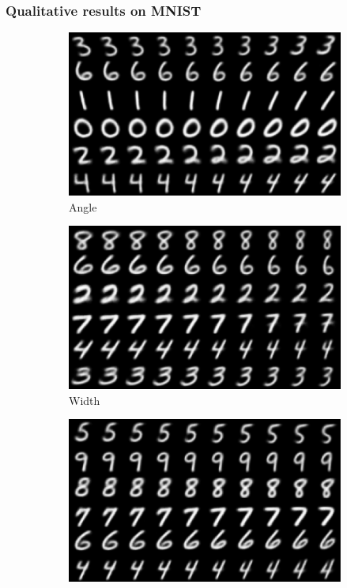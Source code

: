 \documentclass[10pt,mathserif]{beamer}
\begin{document}
\begin{frame}
\frametitle{Qualitative results on MNIST}
\begin{figure}[bp]
\centering
\begin{subfigure}[t]{0.48\linewidth}
\centering
\includegraphics[width=0.8\linewidth]{dis_asset/mnist_slant.png}
\caption{Angle}
\end{subfigure}\hspace{0.005\linewidth}
\begin{subfigure}[t]{0.48\linewidth}
\centering
\includegraphics[width=0.8\linewidth]{dis_asset/mnist_width.png}
\caption{Width}
\end{subfigure}\hspace{0.005\linewidth}
\begin{subfigure}[t]{0.48\linewidth}
\centering
\includegraphics[width=0.8\linewidth]{dis_asset/mnist_style.png}

\end{subfigure}
\end{figure}
\end{frame}
\end{document}
